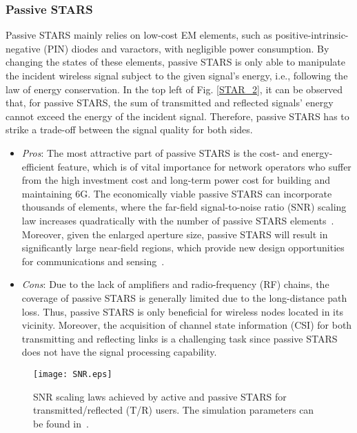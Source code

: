 \documentclass[journal]{IEEEtran}
\theoremstyle{definition}
\begin{document}
\subsubsection{Passive STARS} Passive STARS mainly relies on low-cost EM elements, such as positive-intrinsic-negative (PIN) diodes and varactors, with negligible power consumption. By changing the states of these elements, passive STARS is only able to manipulate the incident wireless signal subject to the given signal's energy, i.e., following the law of energy conservation. In the top left of Fig. \ref{STAR_2}, it can be observed that, for passive STARS, the sum of transmitted and reflected signals' energy cannot exceed the energy of the incident signal. Therefore, passive STARS has to strike a trade-off between the signal quality for both sides.
\begin{itemize}	
	\item \emph{Pros}: The most attractive part of passive STARS is the cost- and energy-efficient feature, which is of vital importance for network operators who suffer from the high investment cost and long-term power cost for building and maintaining 6G. The economically viable passive STARS can incorporate thousands of elements, where the far-field signal-to-noise ratio (SNR) scaling law increases quadratically with the number of passive STARS elements~\cite{10163896}. Moreover, given the enlarged aperture size, passive STARS will result in significantly large near-field regions, which provide new design opportunities for communications and sensing~\cite{10558818}.
    \item \emph{Cons}: Due to the lack of amplifiers and radio-frequency (RF) chains, the coverage of passive STARS is generally limited due to the long-distance path loss. Thus, passive STARS is only beneficial for wireless nodes located in its vicinity. Moreover, the acquisition of channel state information (CSI) for both transmitting and reflecting links is a challenging task since passive STARS does not have the signal processing capability.
\end{itemize}
\begin{figure}[t!]
\begin{center}
    \texttt{[image: SNR.eps]}
    \caption{SNR scaling laws achieved by active and passive STARS for transmitted/reflected (T/R) users. The simulation parameters can be found in~\cite{10163896}.}
    \label{STAR_3}
\end{center}
\end{figure}
\end{document}
